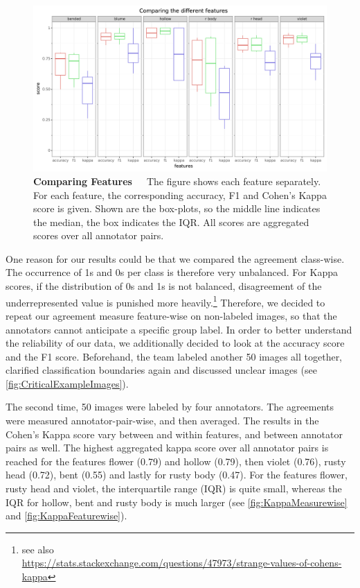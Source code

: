 \begin{figure}[!ht]
	\centering
	\includegraphics[scale=0.55]{Figures/chapter03/kappa_featurewise.png}
	\decoRule
	\caption[Feature-Wise Comparison of Agreement Measure Scores]{\textbf{Comparing Features}~~~The figure shows each feature separately. For each feature, the corresponding accuracy, F1 and Cohen’s Kappa score is given. Shown are the box-plots, so the middle line indicates the median, the box indicates the IQR. All scores are aggregated scores over all annotator pairs.}
	\label{fig:KappaFeaturewise}
\end{figure}

One reason for our results could be that we compared the agreement class-wise. The occurrence of 1s and 0s per class is therefore very unbalanced. For Kappa scores, if the distribution of 0s and 1s is not balanced, disagreement of the underrepresented value is punished more heavily.\footnote{see also \\ \url{https://stats.stackexchange.com/questions/47973/strange-values-of-cohens-kappa}} Therefore, we decided to repeat our agreement measure feature-wise on non-labeled images, so that the annotators cannot anticipate a specific group label. In order to better understand the reliability of our data, we additionally decided to look at the accuracy score and the F1 score. Beforehand, the team labeled another 50 images all together, clarified classification boundaries again and discussed unclear images (see \autoref{fig:CriticalExampleImages}).

The second time, 50 images were labeled by four annotators. The agreements were measured annotator-pair-wise, and then averaged. The results in the Cohen’s Kappa score vary between and within features, and between annotator pairs as well. The highest aggregated kappa score over all annotator pairs is reached for the features flower (0.79) and hollow (0.79), then violet (0.76), rusty head (0.72), bent (0.55) and lastly for rusty body (0.47).
For the features flower, rusty head and violet, the interquartile range (IQR) is quite small, whereas the IQR for hollow, bent and rusty body is much larger (see \autoref{fig:KappaMeasurewise} and \autoref{fig:KappaFeaturewise}).

